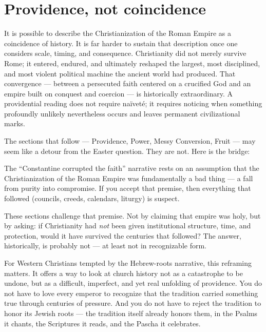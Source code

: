 \documentclass[10pt,twoside,openany]{book}
\begin{document}

\section{Providence, not coincidence}

It is possible to describe the Christianization of the Roman Empire as
a coincidence of history. It is far harder to sustain that description
once one considers scale, timing, and consequence. Christianity did not
merely survive Rome; it entered, endured, and ultimately reshaped the
largest, most disciplined, and most violent political machine the
ancient world had produced. That convergence --- between a persecuted
faith centered on a crucified God and an empire built on conquest and
coercion --- is historically extraordinary. A providential reading does
not require na\"ivet\'e; it requires noticing when something profoundly
unlikely nevertheless occurs and leaves permanent civilizational marks.

\begin{westernbox}
The sections that follow --- Providence, Power, Messy
Conversion, Fruit --- may seem like a detour from the
Easter question. They are not. Here is the bridge:

The ``Constantine corrupted the faith'' narrative rests
on an assumption that the Christianization of the Roman
Empire was fundamentally a bad thing --- a fall from
purity into compromise. If you accept that premise,
then everything that followed (councils, creeds,
calendars, liturgy) is suspect.

These sections challenge that premise. Not by claiming
that empire was holy, but by asking: if Christianity
had \emph{not} been given institutional structure, time, and
protection, would it have survived the centuries that
followed? The answer, historically, is probably not ---
at least not in recognizable form.

For Western Christians tempted by the Hebrew-roots
narrative, this reframing matters. It offers a way to
look at church history not as a catastrophe to be
undone, but as a difficult, imperfect, and yet real
unfolding of providence. You do not have to love every
emperor to recognize that the tradition carried
something true through centuries of pressure. And you
do not have to reject the tradition to honor its Jewish
roots --- the tradition itself already honors them, in
the Psalms it chants, the Scriptures it reads, and the
Pascha it celebrates.
\end{westernbox}
\end{document}
